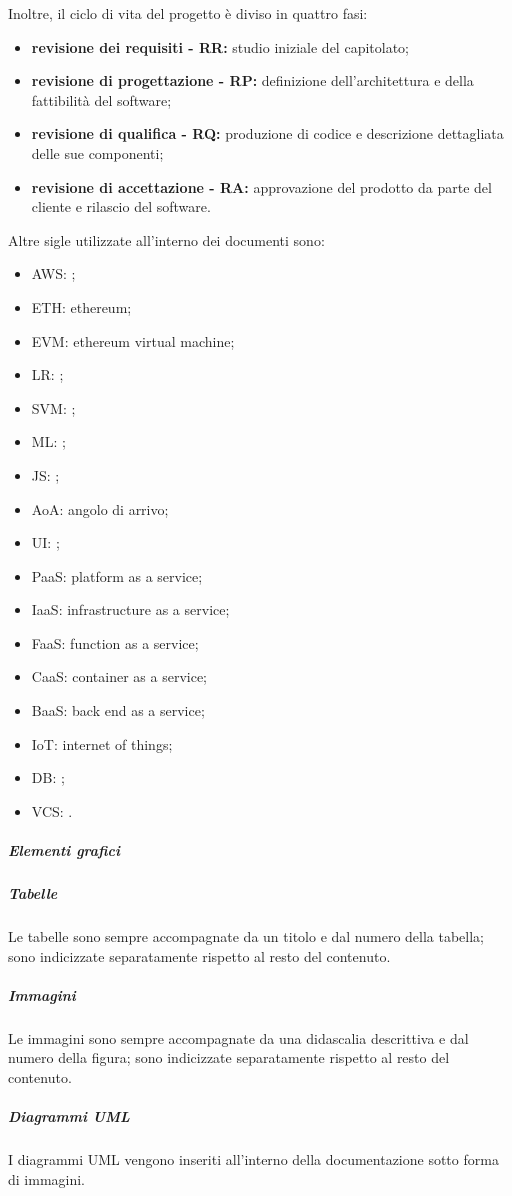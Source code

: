 					Inoltre, il ciclo di vita del progetto è diviso in quattro fasi:
					\begin{itemize}
						\item \textbf{revisione dei requisiti - RR:} studio iniziale del capitolato;
						\item \textbf{revisione di progettazione - RP:} definizione dell'architettura e della fattibilità del software;
						\item \textbf{revisione di qualifica - RQ:} produzione di codice e descrizione dettagliata delle sue componenti;
						\item \textbf{revisione di accettazione - RA:} approvazione del prodotto da parte del cliente e rilascio del software.
					\end{itemize}
					Altre sigle utilizzate all'interno dei documenti sono:
					\begin{itemize}
						\item AWS: ;
						\item ETH: ethereum;
						\item EVM: ethereum virtual machine;
						\item LR: ;
						\item SVM: ;
						\item ML: ;
						\item JS: ;
						\item AoA: angolo di arrivo;
						\item UI: ;
						\item PaaS: platform as a service;
						\item IaaS: infrastructure as a service;
						\item FaaS: function as a service;
						\item CaaS: container as a service;
						\item BaaS: back end as a service;
						\item IoT: internet of things;
						\item DB: ;
						\item VCS: .
					\end{itemize}

			\subparagraph{Elementi grafici}
				\subparagraph{Tabelle}
					Le tabelle sono sempre accompagnate da un titolo e dal numero della tabella; sono indicizzate separatamente rispetto al resto del contenuto.
				\subparagraph{Immagini}
					Le immagini sono sempre accompagnate da una didascalia descrittiva e dal numero della figura; sono indicizzate separatamente rispetto al resto del contenuto.
				\subparagraph{Diagrammi UML}
					I diagrammi UML vengono inseriti all'interno della documentazione sotto forma di immagini.

